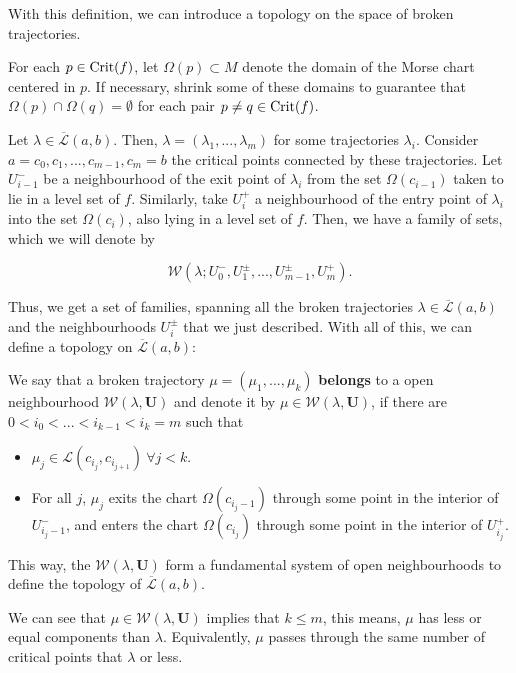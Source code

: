 With this definition, we can introduce a topology on the space of broken trajectories.

For each $p \in \text{Crit}(f)$, let $\Omega(p) \subset M$ denote the domain of the Morse chart centered in $p$. If necessary, shrink some of these domains to guarantee that $\Omega(p) \cap \Omega(q) = \emptyset$ for each pair $p \neq q \in \text{Crit}(f)$.

Let $\lambda \in \overline{\mathcal{L}}(a,b)$. Then, $\lambda = (\lambda_1,...,\lambda_m)$ for some trajectories $\lambda_i$. Consider $a = c_0, c_1, ..., c_{m-1}, c_m = b$ the critical points connected by these trajectories. Let $U_{i-1}^{-}$ be a neighbourhood of the exit point of $\lambda_i$ from the set $\Omega(c_{i-1})$ taken to lie in a level set of $f$. Similarly, take $U_i^+$ a neighbourhood of the entry point of $\lambda_i$ into the set $\Omega(c_i)$, also lying in a level set of $f$. Then, we have a family of sets, which we will denote by

$$\mathcal{W}(\lambda; U_0^{-}, U_1^{\pm},...,U_{m-1}^{\pm},U_m^{+}) .$$

Thus, we get a set of families, spanning all the broken trajectories $\lambda \in \overline{\mathcal{L}}(a,b)$ and the neighbourhoods $U_i^{\pm}$ that we just described. With all of this, we can define a topology on $\overline{\mathcal{L}}(a,b)$:

\begin{deff}
We say that a broken trajectory $\mu = (\mu_1,...,\mu_k)$ {\bf belongs} to a open neighbourhood $\mathcal{W}(\lambda,\mathbf{U})$ and denote it by $\mu \in \mathcal{W}(\lambda, \mathbf{U})$, if there are $0 < i_0 < ... < i_{k-1} < i_k = m$ such that

\begin{itemize}
	\item $\mu_j \in \mathcal{L}(c_{i_j},c_{i_{j+1}}) \ \forall j < k$.
	\item For all $j$, $\mu_j$ exits the chart $\Omega(c_{i_j-1})$ through some point in the interior of $U_{i_j-1}^{-}$, and enters the chart $\Omega(c_{i_j})$ through some point in the interior of $U_{i_j}^+$.
\end{itemize}

This way, the $\mathcal{W}(\lambda,\mathbf{U})$ form a fundamental system of open neighbourhoods to define the topology of $\overline{\mathcal{L}}(a,b)$.
\end{deff}

\begin{rmrk}
We can see that $\mu \in \mathcal{W}(\lambda, \mathbf{U})$ implies that $k \leq m$, this means, $\mu$ has less or equal components than $\lambda$. Equivalently, $\mu$ passes through the same number of critical points that $\lambda$ or less.
\end{rmrk}


